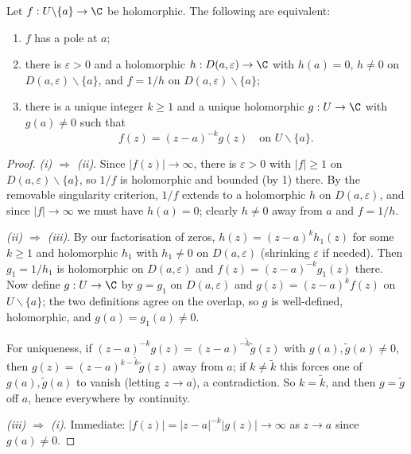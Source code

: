 \begin{proposition}
    Let $f: U \backslash \{a\} \rightarrow \C$ be holomorphic. The following are equivalent:
    \begin{enumerate}[label=(\roman*)]
        \item $f$ has a pole at $a$;
        \item there is $\varepsilon > 0$ and a holomorphic $h: D(a, \varepsilon) \rightarrow \C$ with $h(a) = 0$, $h \neq 0$ on $D(a, \varepsilon) \backslash \{a\}$, and $f = 1/h$ on $D(a, \varepsilon) \backslash \{a\}$;
        \item there is a unique integer $k \geq 1$ and a unique holomorphic $g: U \rightarrow \C$ with $g(a) \neq 0$ such that
        $$
        f(z) = (z - a)^{-k} g(z) \quad \text{on } U \backslash \{a\}.
        $$
    \end{enumerate}
\end{proposition}
\begin{proof}
    \emph{(i) $\Rightarrow$ (ii)}. Since $|f(z)| \rightarrow \infty$, there is $\varepsilon > 0$ with $|f| \geq 1$ on $D(a, \varepsilon)\backslash\{a\}$, so $1/f$ is holomorphic and bounded (by 1) there. By the removable singularity criterion, $1/f$ extends to a holomorphic $h$ on $D(a, \varepsilon)$, and since $|f| \rightarrow \infty$ we must have $h(a) = 0$; clearly $h \neq 0$ away from $a$ and $f = 1/h$.

    \emph{(ii) $\Rightarrow$ (iii)}. By our factorisation of zeros, $h(z) = (z - a)^k h_1(z)$ for some $k \geq 1$ and holomorphic $h_1$ with $h_1 \neq 0$ on $D(a, \varepsilon)$ (shrinking $\varepsilon$ if needed). Then $g_1 = 1/h_1$ is holomorphic on $D(a, \varepsilon)$ and $f(z) = (z - a)^{-k}g_1(z)$ there. Now define $g: U \rightarrow \C$ by $g = g_1$ on $D(a, \varepsilon)$ and $g(z) = (z - a)^k f(z)$ on $U \backslash \{a\}$; the two definitions agree on the overlap, so $g$ is well-defined, holomorphic, and $g(a) = g_1(a) \neq 0$.

    For uniqueness, if $(z - a)^{-k}g(z) = (z - a)^{-\tilde{k}}\tilde{g}(z)$ with $g(a), \tilde{g}(a) \neq 0$, then $g(z) = (z - a)^{k - \tilde{k}}\tilde{g}(z)$ away from $a$; if $k \neq \tilde{k}$ this forces one of $g(a), \tilde{g}(a)$ to vanish (letting $z \rightarrow a$), a contradiction. So $k = \tilde{k}$, and then $g = \tilde{g}$ off $a$, hence everywhere by continuity.

    \emph{(iii) $\Rightarrow$ (i)}. Immediate: $|f(z)| = |z - a|^{-k}|g(z)| \rightarrow \infty$ as $z \rightarrow a$ since $g(a) \neq 0$.
\end{proof}

